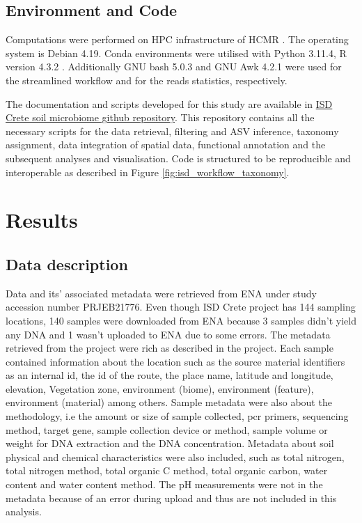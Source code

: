 \subsection{Environment and Code}

Computations were performed on HPC infrastructure of HCMR \parencite{zafeiropoulos_0s_2021}.
The operating system is Debian 4.19. Conda environments were utilised
with Python 3.11.4, R version 4.3.2 \parencite{rcoreteam}.
Additionally GNU bash 5.0.3 and GNU Awk 4.2.1 were used for the streamlined workflow 
and for the reads statistics, respectively.

The documentation and scripts developed for this study are available in
\href{https://github.com/GenomicsStandardsConsortium/ISD}{ISD Crete soil microbiome github repository}.
This repository contains all the necessary scripts for the data retrieval,
filtering and ASV inference, taxonomy assignment, data integration of spatial data, 
functional annotation and the subsequent analyses and visualisation.
Code is structured to be reproducible and interoperable as described in Figure \ref{fig:isd_workflow_taxonomy}.

\section{Results}\label{isd_results}

\subsection{Data description}
Data and its' associated metadata were retrieved from ENA under study
accession number PRJEB21776.
Even though ISD Crete project has 144 sampling locations, 140 samples were
downloaded from ENA because 3 samples didn't yield any DNA and 1 wasn't uploaded to ENA due 
to some errors.
The metadata retrieved from the project were rich as described in the project. 
Each sample contained information about the location such as the source material identifiers as an internal
id, the id of the route, the place name, latitude and longitude, elevation, Vegetation zone,
environment (biome), environment (feature), environment (material) among others.
Sample metadata were also about the methodology, i.e the amount or size of sample collected,
pcr primers, sequencing method, target gene, sample collection device or method,
sample volume or weight for DNA extraction and the DNA concentration.
Metadata about soil physical and chemical characteristics were also included, 
such as total nitrogen, total nitrogen method, total organic C method,
total organic carbon, water content and water content method. The pH measurements
were not in the metadata because of an error during upload and thus are not 
included in this analysis.


